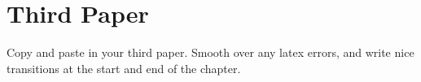 \chapter{Third Paper}\label{ch:5}

Copy and paste in your third paper. Smooth over any latex errors, and write nice transitions at the start and end of the chapter.